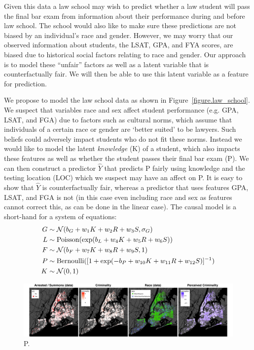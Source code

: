 Given this data a law school may wish to predict whether a law student
will pass the final bar exam from information about their performance
during and before law school. The school would also like to make sure
these predictions are not biased by an individual's race and
gender. However, we may worry that our observed information about
students, the LSAT, GPA, and FYA scores, are biased due to historical
social factors relating to race and gender. Our approach is to model these
``unfair'' factors as well as a latent variable that is counterfactually
fair. We will then be able to use this latent variable as a feature
for prediction.

We propose to model the law school data as shown in
Figure~\ref{figure.law_school}. We suspect that variables race and sex
affect student performance (e.g. GPA, LSAT, and FGA) due to factors
such as cultural norms, which assume that individuals of a certain
race or gender are `better suited' to be lawyers. Such beliefs could
adversely impact students who do not fit these norms. Instead we would
like to model the latent \emph{knowledge} (K) of a student, which also
impacts these features as well as whether the student passes their
final bar exam (P). We can then construct a predictor $\hat{Y}$ that
predicts P fairly using knowledge and the testing location (LOC) which
we suspect may have an affect on P. It is easy to show that $\hat{Y}$
is counterfactually fair, whereas a predictor that uses features GPA,
LSAT, and FGA is not (in this case even including race and sex as
features cannot correct this, as can be done in the linear case). The
causal model is a short-hand for a system of equations:
\begin{align}
G &\sim {\cal N}(b_G + w_1 K + w_2 R + w_3 S, \sigma_G) \nonumber \\
L &\sim \textrm{Poisson}(\exp(b_L + w_4 K + w_5 R + w_6 S)) \nonumber \\
F &\sim {\cal N}(b_F + w_7 K + w_8 R + w_{9} S, 1) \nonumber \\
P &\sim \textrm{Bernoulli}([1+\exp(-b_P + w_{10} K + w_{11} R + w_{12} S)]^{-1}) \nonumber \\
K &\sim {\cal N}(0,1) \nonumber
\end{align}

 

\begin{figure}[th]
\begin{center}
\vspace{-2ex}
\centerline{\includegraphics[width=\textwidth]{stop_and_frisk_graphs.png}}
\vspace{-2ex}
\caption{P.}
\label{figure.criminality}
\vspace{-2ex}
\end{center}
\end{figure}

